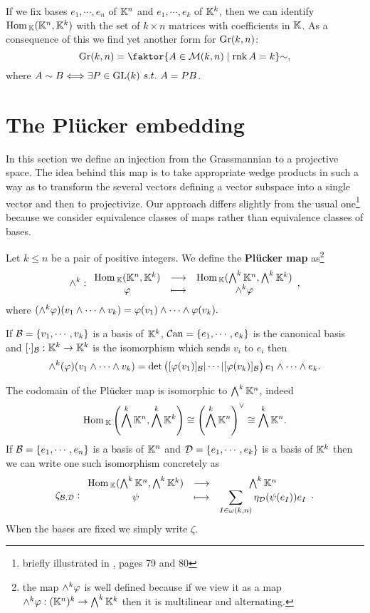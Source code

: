 \begin{remark}
If we fix bases $e_1,\cdots, e_n$ of $\mathbb{K}^n$ and $e_1,\cdots, e_k$ of $\mathbb{K}^k$, then we can identify $\mathrm{Hom}\,_{\mathbb{K}}(\mathbb{K}^n,\mathbb{K}^k)$ with the set of $k\times n$ matrices with coefficients in $\mathbb{K}$. As a consequence of this we find yet another form for $\mathrm{Gr}(k,n)$:
\[\Gr(k,n)=\quot{\cpa{A\in \Mc(k,n)\mid \rnk A=k}}{\sim},\] 
where $A\sim B\Longleftrightarrow \exists P\in \mathrm{GL}(k)\ s.t.\ A=PB$.
\end{remark}

\section{The Pl\"ucker embedding}
In this section we define an injection from the Grassmannian to a projective space.
The idea behind this map is to take appropriate wedge products in such a way as to transform the several vectors defining a vector subspace into a single vector and then to projectivize. 
Our approach differs slightly from the usual one\footnote{briefly illustrated in \cite{matroids}, pages 79 and 80} because we consider equivalence classes of maps rather than equivalence classes of bases.

\begin{definition}
Let $k\leq n$ be a pair of positive integers. We define the \textbf{Pl\"ucker map} as\footnote{the map $\wedge^k\varphi$ is well defined because if we view it as a map $\wedge^k\varphi:(\mathbb{K}^n)^k\to \bigwedge^k\mathbb{K}^k$ then it is multilinear and alternating.}
\[\wedge^k:\begin{array}{ccc} {\mathrm{Hom}\,_{\mathbb{K}}(\mathbb{K}^n,\mathbb{K}^k)} & \longrightarrow & {\mathrm{Hom}\,_{\mathbb{K}}(\bigwedge^k\mathbb{K}^n,\bigwedge^k\mathbb{K}^k)}\\ {\varphi} & \longmapsto & {\wedge^k\varphi} \end{array},\]
where $(\wedge^k\varphi)(v_1\wedge\cdots\wedge v_k)=\varphi(v_1)\wedge\cdots\wedge\varphi(v_k).$
\end{definition}

\begin{remark}
If $\mathcal{B}=\left\{{v_1,\cdots, v_k}\right\}$ is a basis of $\mathbb{K}^k$, ${\mathcal{C}\mathrm{an}}=\left\{{e_1,\cdots,e_k}\right\}$ is the canonical basis and $[\cdot]_{\mathcal{B}}:\mathbb{K}^k\to\mathbb{K}^k$ is the isomorphism which sends $v_i$ to $e_i$ then
\[\wedge^k(\varphi)(v_1\wedge\cdots\wedge v_k)=\det\begin{pmatrix}[\varphi(v_1)]_{\mathcal{B}}|\cdots|[\varphi(v_k)]_{\mathcal{B}}\end{pmatrix} e_1\wedge\cdots\wedge e_k.\]
\end{remark}

\begin{remark}\label{CodomainOfPluckerMap}
The codomain of the Pl\"ucker map is isomorphic to $\bigwedge^k\mathbb{K}^n$, indeed
\[\mathrm{Hom}\,_{\mathbb{K}}\left({\bigwedge^k\mathbb{K}^n,\bigwedge^k\mathbb{K}^k}\right)\cong \left({\bigwedge^k\mathbb{K}^n}\right)^{\vee}\cong \bigwedge^k\mathbb{K}^n.\]
If $\mathcal{B}=\left\{{e_1,\cdots, e_n}\right\}$ is a basis of $\mathbb{K}^n$ and $\mathcal{D}=\left\{{e_1,\cdots, e_k}\right\}$ is a basis of $\mathbb{K}^k$ then we can write one such isomorphism concretely as
\[\zeta_{\mathcal{B},\mathcal{D}}:\begin{array}{ccc} {\mathrm{Hom}\,_{\mathbb{K}}(\bigwedge^k\mathbb{K}^n,\bigwedge^k\mathbb{K}^k)} & \longrightarrow & {\bigwedge^k\mathbb{K}^n}\\ {\psi} & \longmapsto & {\displaystyle\sum_{I\in\omega(k,n)} \eta_{\mathcal{D}}(\psi(e_I))e_I} \end{array}.\]
When the bases are fixed we simply write $\zeta$.
\end{remark}

